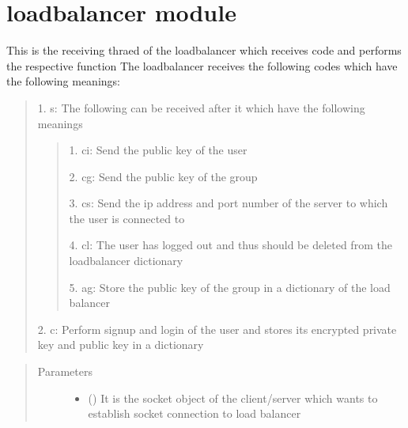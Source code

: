 \documentclass[letterpaper,10pt,english]{sphinxmanual}
\begin{document}
\section{loadbalancer module}
\label{\detokenize{loadbalancer:module-loadbalancer}}\label{\detokenize{loadbalancer:loadbalancer-module}}\label{\detokenize{loadbalancer::doc}}

\begin{fulllineitems}
\label{\detokenize{loadbalancer:loadbalancer.clientthread}}
\sphinxAtStartPar
This is the receiving thraed of the loadbalancer which receives code and performs the respective function
The loadbalancer receives the following codes which have the following meanings:
\begin{quote}

\begin{DUlineblock}{0em}
\item[] 1. s: The following can be received after it which have the following meanings
\end{DUlineblock}
\begin{quote}

\begin{DUlineblock}{0em}
\item[] 1. ci: Send the public key of the user
\item[] 2. cg: Send the public key of the group
\item[] 3. cs: Send the ip address and port number of the server to which the user is connected to
\item[] 4. cl: The user has logged out and thus should be deleted from the loadbalancer dictionary
\item[] 5. ag: Store the public key of the group in a dictionary of the load balancer
\end{DUlineblock}
\end{quote}

\begin{DUlineblock}{0em}
\item[] 2. c: Perform sign\sphinxhyphen{}up and login of the user and stores its encrypted private key and public key in a dictionary
\end{DUlineblock}
\end{quote}
\begin{quote}\begin{description}
\item[{Parameters}] \leavevmode\begin{itemize}
\item {} 
\sphinxAtStartPar
{} () \textendash{} It is the socket object of the client/server which wants to establish socket connection to load balancer


\end{itemize}
\end{description}
\end{quote}
\end{fulllineitems}
\end{document}
